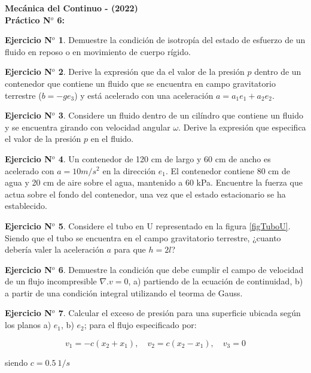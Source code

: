 \documentclass[11pt,a4paper]{article}
\theoremstyle{definition}
\newtheorem{theorem}{Ejercicio N$^o$}
\begin{document}
\begin{center}
\textbf{\large Mecánica del Continuo -  (2022) \\
                 Práctico N$^o$ 6:}
\end{center}

\begin{theorem}
Demuestre la condición de isotropía del estado de esfuerzo de un fluido en reposo o en movimiento de cuerpo rígido. 
\end{theorem}

\begin{theorem}
Derive la expresión que da el valor de la presión $p$ dentro de un contenedor que contiene un fluido que se encuentra en campo gravitatorio terrestre ($b=-ge_3$) y está acelerado con una aceleración $a=a_1 e_1 + a_2 e_2$.
\end{theorem}

\begin{theorem}
Considere un fluido dentro de un cilíndro que contiene un fluido y se encuentra girando con velocidad angular $\omega$. Derive la expresión que especifica el valor de la presión $p$ en el fluido. 
\end{theorem}

\begin{theorem}
Un contenedor de 120 cm de largo y 60 cm de ancho es acelerado con $a=10m/s^2$ en la dirección $e_1$. El contenedor contiene 80 cm de agua y 20 cm de aire sobre el agua, mantenido a 60 kPa. Encuentre la fuerza que actua sobre el fondo del contenedor, una vez que el estado estacionario se ha establecido.
\end{theorem}

\begin{theorem}
Considere el tubo en U representado en la figura \ref{figTuboU}. Siendo que el tubo se encuentra en el campo gravitatorio terrestre, ¿cuanto deber\'ia valer la aceleraci\'on $a$ para que $h=2l$?
\end{theorem}

\begin{theorem}
Demuestre la condición que debe cumplir el campo de velocidad de un flujo incompresible $\nabla. v=0$, a) partiendo de la ecuación de continuidad, b) a partir de una condición integral utilizando el teorma de Gauss.
\end{theorem}

\begin{theorem}

Calcular el exceso de presión para una superficie ubicada según los planos a) $e_1$, b) $e_2$; para el flujo especificado por:

\[
v_1=-c(x_2+x_1), \quad v_2=c(x_2-x_1), \quad v_3=0
\]

\noindent siendo $c=0.5 \: 1/s$
\end{theorem}
\end{document}
